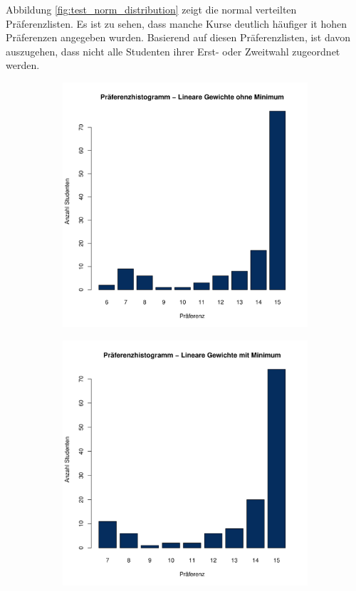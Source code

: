 			Abbildung \ref{fig:test_norm_distribution} zeigt die normal verteilten Präferenzlisten.
            Es ist zu sehen, dass manche Kurse deutlich häufiger it hohen Präferenzen angegeben wurden.
            Basierend auf diesen Präferenzlisten, ist davon auszugehen, dass nicht alle Studenten ihrer Erst- oder Zweitwahl zugeordnet werden.
			
			\begin{figure}[ht]
				\centering
				\begin{subfigure}{0.49\textwidth}
					\includegraphics[width=1.0\textwidth]{./testing/images/NormalDistPreferencesHistLin.jpg}
				\end{subfigure}
				\begin{subfigure}{0.49\textwidth}
					\includegraphics[width=1.0\textwidth]{./testing/images/NormalDistPreferencesHistLinMin.jpg}

\end{subfigure}
\end{figure}
